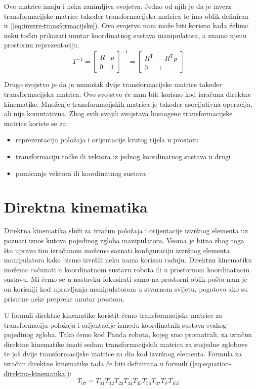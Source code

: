\documentclass[times, utf8, diplomskirad]{fer}
\begin{document}
Ove matrice imaju i neka zanimljiva svojstva.
Jedno od njih je da je inverz transformacijske matrice također transformacijska matrica te ima oblik definiran u (\ref{eq:inverz-transformacijske}).
Ovo svojstvo nam može biti korisno kada želimo neku točku prikazati unutar koordinatnog sustava manipulatora, a znamo njenu prostornu reprezentaciju.
\begin{equation}
    T^{-1}=\left[\begin{array}{cc}
    R & p \\
    0 & 1
    \end{array}\right]^{-1}=\left[\begin{array}{cc}
    R^{\mathrm{T}} & -R^{\mathrm{T}} p \\
    0 & 1
    \end{array}\right]
\label{eq:inverz-transformacijske}
\end{equation}

Drugo svojstvo je da je umnožak dvije transformacijske matrice također transformacijska matrica.
Ovo svojstvo će nam biti korisno kod izračuna direktne kinematike.
Množenje transformacijskih matrica je također asocijativna operacija, ali nije komutativna.
Zbog svih svojih svojstava homogene transformacijske matrice koriste se za:
\begin{itemize}
    \item reprezentaciju položaja i orijentacije krutog tijela u prostoru
    \item transformaciju točke ili vektora iz jednog koordinatnog sustava u drugi
    \item pomicanje vektora ili koordinatnog sustava
\end{itemize}

\newpage
\section{Direktna kinematika}
Direktna kinematika služi za izračun položaja i orijentacije izvršnog elementa uz poznati iznos kutova pojedinog zgloba manipulatora.
Veoma je bitna zbog toga što upravo tim izračunom možemo saznati konfiguraciju izvršnog elementa manipulatora kako bismo izvršili neku nama korisnu radnju.
Direktnu kinematiku možemo računati u koordinatnom sustavu robota ili u prostornom koordinatnom sustavu.
Mi ćemo se u nastavku fokusirati samo na prostorni oblik pošto nam je on korisniji kod upravljanja manipulatorom u stvarnom svijetu, pogotovo ako su prisutne neke prepreke unutar prostora.

U formuli direktne kinematike koristit ćemo transformacijske matrice za transformaciju položaja i orijentacije između koordinatnih sustava svakog pojedinog zgloba.
Tako ćemo kod Panda robota, kojeg smo promatrali, za izračun direktne kinematike imati sedam transformacijskih matrica za susjedne zglobove te još dvije transformacijske matrice za dio kod izvršnog elementa.
Formula za izračun direktne kinematike tada će biti definirana u formuli (\ref{eq:equation-direktna-kinematika}):
\begin{equation}
T_{07}=T_{01} T_{12} T_{23} T_{34} T_{45} T_{56} T_{67} T_{F} T_{EE}
    \label{eq:equation-direktna-kinematika}
\end{equation}
\end{document}
